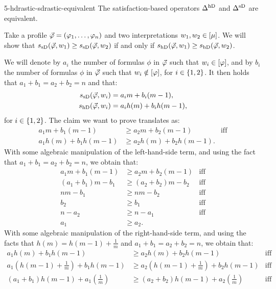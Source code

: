 \begin{lem}{}{5-hdrastic-sdrastic-equivalent}
	The satisfaction-based operators $\mer{\hdrastic}{}$ and $\mer{\sdrastic}{}$ are equivalent.
\end{lem}
\begin{prf*}{}{}%
	Take a profile $\P=(\phi_1,\dots,\phi_n)$
	and two interpretations $w_1,w_2\in\mods{\mu}$.
	We will show that 
	$\sat_\sdrastic(\P,w_1)\geq\sat_\sdrastic(\P,w_2)$ if and only if 
	$\sat_\hdrastic(\P,w_1)\geq\sat_\hdrastic(\P,w_2)$.
	
	We will denote by $a_i$ the number of formulas $\phi$ in $\P$ such that
	$w_i\in\mods{\phi}$,
	and by $b_i$ the number of formulas $\phi$ in $\P$ such that
	$w_i\notin\mods{\phi}$,
	for $i\in\set{1,2}$.
	It then holds that $a_1+b_1 = a_2+b_2 = n$ and
	that:
	\begin{align*}
	\sat_\sdrastic(\P,w_i) & = a_im+ b_i(m-1),\\
	\sat_\hdrastic(\P,w_i) & = a_ih(m)+ b_ih(m-1),
	\end{align*}
	for $i\in\set{1,2}$.
	The claim we want to prove translates as:
	\begin{align*}
		a_1m+ b_1(m-1)		& \geq a_2m+ b_2(m-1)&\text{iff}\\
		a_1h(m)+ b_1h(m-1)	& \geq a_2h(m)+ b_2h(m-1).&		
	\end{align*}
	With some algebraic manipulation of the left-hand-side term, and using the fact that $a_1+b_1=a_2+b_2=n$,
	we obtain that:
	\begin{align*}
		a_1m+ b_1(m-1) & \geq a_2m+ b_2(m-1) & \text{iff}\\
		(a_1+b_1)m-b_1 & \geq(a_2+b_2)m-b_2  & \text{iff}\\
		nm-b_1         & \geq nm-b_2		 & \text{iff}\\
		b_2            & \geq b_1			 & \text{iff}\\
		n-a_2          & \geq n-a_1			 & \text{iff}\\
		a_1            & \geq a_2.           &
	\end{align*}
	With some algebraic manipulation of the right-hand-side term, and using the facts that
	$h(m)=h(m-1)+\frac{1}{m}$ and $a_1+b_1=a_2+b_2=n$, we obtain that:
	\begin{align*}
		a_1h(m)+ b_1h(m-1)					&\geq a_2h(m)+ b_2h(m-1)				&\text{iff}\\
		a_1(h(m-1)+\frac{1}{m})+ b_1h(m-1)	&\geq a_2(h(m-1)+\frac{1}{m})+ b_2h(m-1)&\text{iff}\\
		(a_1+b_1)h(m-1)+a_1(\frac{1}{m})	&\geq(a_2+b_2)h(m-1)+a_2(\frac{1}{m})	&\text{iff}\\

\end{align*}
\end{prf*}
